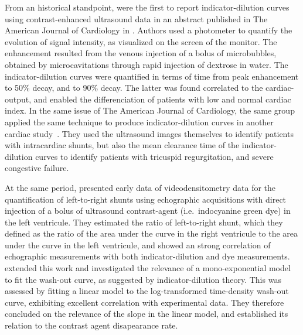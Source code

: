 From an historical standpoint, \citet{Bommer:1978eu} were the first to report indicator-dilution curves using contrast-enhanced ultrasound data in an abstract published in The American Journal of Cardiology in \citeyear{Bommer:1978eu}. %
Authors used a photometer to quantify the evolution of signal intensity, as visualized on the screen of the monitor.
The enhancement resulted from the venous injection of a bolus of microbubbles, obtained by microcavitations through rapid injection of dextrose in water. 
The indicator-dilution curves were quantified in terms of time from peak enhancement to 50\% decay, and to 90\% decay. 
The latter was found correlated to the cardiac-output, and enabled the differenciation of patients with low and normal cardiac index. 
In the same issue of The American Journal of Cardiology, the same group applied the same technique to produce indicator-dilution curves in another cardiac study~\cite{DeMaria:1978il}. %
They used the ultrasound images themselves to identify patients with intracardiac shunts, but also the mean clearance time of the indicator-dilution curves to identify patients with tricuspid regurgitation, and severe congestive failure.

At the same period, \citet{Hagler:1982hs} presented early data of videodensitometry data for the quantification of left-to-right shunts using echographic acquisitions with direct injection of a bolus of ultrasound contrast-agent (i.e.~indocyanine green dye) in the left ventricule. %
They estimated the ratio of left-to-right shunt, which they defined as the ratio of the area under the curve in the right ventricule to the area under the curve in the left ventricule, and showed an strong correlation of echographic measurements with both indicator-dilution and dye measurements.
\citet{Meltzer:1982vt} extended this work and investigated the relevance of a mono-exponential model to fit the wash-out curve, as suggested by indicator-dilution theory. %
This was assessed by fitting a linear model to the log-transformed time-density wash-out curve, exhibiting excellent correlation with experimental data. 
They therefore concluded on the relevance of the slope in the linear model, and established its relation to the contrast agent disapearance rate. 

